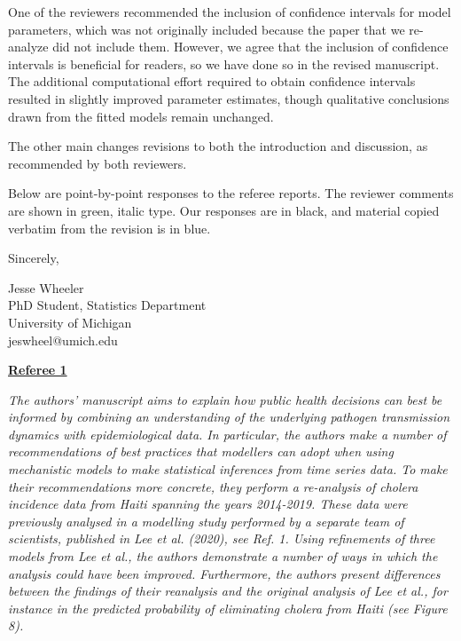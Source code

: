\documentclass[11pt]{article}
\newcommand\report[1]{{\color{mygreen} \vspace{1mm}\hspace{0.25in}\parbox{6in}{\em #1}}}
\begin{document}
One of the reviewers recommended the inclusion of confidence intervals for model parameters, which was not originally included because the paper that we re-analyze did not include them. 
However, we agree that the inclusion of confidence intervals is beneficial for readers, so we have done so in the revised manuscript.
The additional computational effort required to obtain confidence intervals resulted in slightly improved parameter estimates, though qualitative conclusions drawn from the fitted models remain unchanged. 

The other main changes revisions to both the introduction and discussion, as recommended by both reviewers. 

Below are point-by-point responses to the referee reports.
The reviewer comments are shown in green, italic type.
Our responses are in black, and material copied verbatim from the revision is in blue.


\vspace{3mm}

Sincerely,




Jesse Wheeler \\
PhD Student, Statistics Department \\
University of Michigan\\
jeswheel@umich.edu

\vspace{5mm}

\newpage


\begin{center}
{\large{\textbf{\underline{Referee 1}}}} %
\end{center}

\report{
  The authors' manuscript aims to explain how public health decisions can best be informed by combining an understanding of the underlying pathogen transmission dynamics with epidemiological data. In particular, the authors make a number of recommendations of best practices that modellers can adopt when using mechanistic models to make statistical inferences from time series data. To make their recommendations more concrete, they perform a re-analysis of cholera incidence data from Haiti spanning the years 2014-2019. These data were previously analysed in a modelling study performed by a separate team of scientists, published in Lee et al. (2020), see Ref. 1. Using refinements of three models from Lee et al., the authors demonstrate a number of ways in which the analysis could have been improved. Furthermore, the authors present differences between the findings of their reanalysis and the original analysis of Lee et al., for instance in the predicted probability of eliminating cholera from Haiti (see Figure 8).
}
\end{document}
